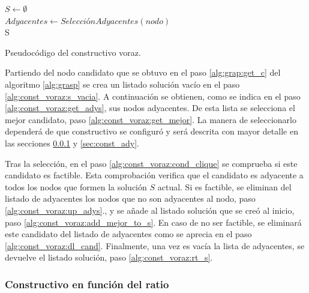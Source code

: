 \begin{algorithm}[H]
	\SetAlgoLined
	$ S \gets \emptyset $ \label{alg:const_voraz:s_vacia} \\[0.2cm]
	$ Adyacentes \gets  SelecciónAdyacentes(nodo) $ \label{alg:const_voraz:get_adys} \\[0.2cm]
	\Return S \label{alg:const_voraz:rt_s}
	\caption{Pseudocódigo del constructivo voraz.}
	\label{alg:const_voraz}
\end{algorithm}

Partiendo del nodo candidato que se obtuvo en el paso \ref{alg:grap:get_c} del algoritmo \ref{alg:grasp} se crea un listado solución vacío en el paso \ref{alg:const_voraz:s_vacia}. A continuación se obtienen, como se indica en el paso \ref{alg:const_voraz:get_adys}, sus nodos adyacentes. De esta lista se selecciona el mejor candidato, paso \ref{alg:const_voraz:get_mejor}. La manera de seleccionarlo dependerá de que constructivo se configuró y será descrita con mayor detalle en las secciones \ref{sec:const_ratio} y \ref{sec:const_ady}.

Tras la selección, en el paso \ref{alg:const_voraz:cond_clique} se comprueba si este candidato es factible. Esta comprobación verifica que el candidato es adyacente a todos los nodos que formen la solución  $S$ actual. Si es factible, se eliminan del listado de adyacentes los nodos que no son adyacentes al nodo, paso \ref{alg:const_voraz:up_adys}., y se añade al listado solución que se creó al inicio, paso \ref{alg:const_voraz:add_mejor_to_s}. En caso de no ser factible, se eliminará este candidato del listado de adyacentes como se aprecia en el paso \ref{alg:const_voraz:dl_cand}. Finalmente, una vez es vacía la lista de adyacentes, se devuelve el listado solución, paso \ref{alg:const_voraz:rt_s}.

\subsubsection{Constructivo en función del ratio}
\label{sec:const_ratio}

